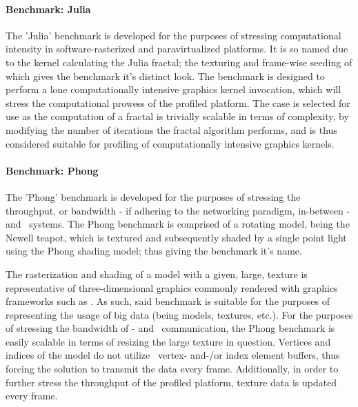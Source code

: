 \paragraph{Benchmark: Julia}
\label{par:experimentalmethodology_benchmarking_benchmarkjulia}
The 'Julia' benchmark is developed for the purposes of stressing computational intensity in software-rasterized and paravirtualized platforms.
It is so named due to the kernel calculating the Julia fractal; the texturing and frame-wise seeding of which gives the benchmark it's distinct look.
The benchmark is designed to perform a lone computationally intensive graphics kernel invocation, which will stress the computational prowess of the profiled platform.
The case is selected for use as the computation of a fractal is trivially scalable in terms of complexity, by modifying the number of iterations the fractal algorithm performs, and is thus considered suitable for profiling of computationally intensive graphics kernels.

\paragraph{Benchmark: Phong}
\label{par:experimentalmethodology_benchmarking_benchmarkphong}
The 'Phong' benchmark is developed for the purposes of stressing the throughput, or bandwidth - if adhering to the networking paradigm, in-between \dvttermtarget - and \dvttermhost\ systems.
The Phong benchmark is comprised of a rotating model, being the Newell teapot, which is textured and subsequently shaded by a single point light using the Phong shading model; thus giving the benchmark it's name. %

The rasterization and shading of a model with a given, large, texture is representative of three-dimensional graphics commonly rendered with graphics frameworks such as \dvttermopenglestwopointo .
As such, said benchmark is suitable for the purposes of representing the usage of big data (being models, textures, etc.).
For the purposes of stressing the bandwidth of \dvttermtarget - and \dvttermhost\ communication, the Phong benchmark is easily scalable in terms of resizing the large texture in question.
Vertices and indices of the model do not utilize \dvttermopengl\ vertex- and-/or index element buffers, thus forcing the solution to transmit the data every frame.
Additionally, in order to further stress the throughput of the profiled platform, texture data is updated every frame.

